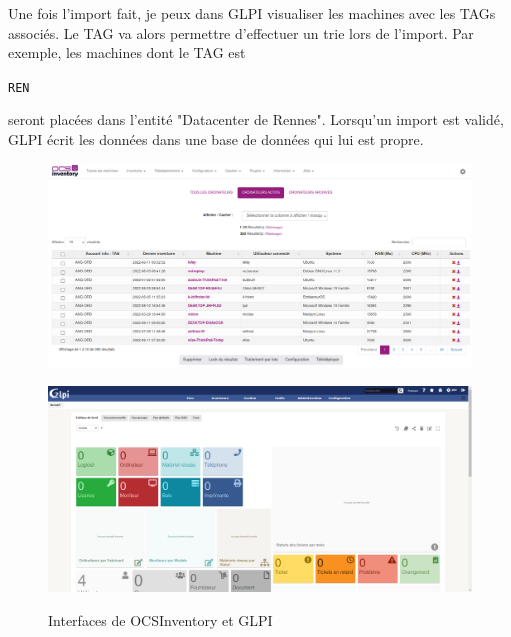 \documentclass[12pt]{article}
\begin{document}
Une fois l'import fait, je peux dans \gls{GLPI} visualiser les machines avec les TAGs associés. 
Le TAG va alors permettre d'effectuer un trie lors de l'import. 
Par exemple, les machines dont le TAG est \begin{code}\texttt{REN}\end{code} seront placées dans l'entité "Datacenter de Rennes".
Lorsqu'un import est validé, \gls{GLPI} écrit les données dans une base de données qui lui est propre. \\

\begin{figure}[ht!]
\noindent%
\begin{minipage}{.5\textwidth}%
\begin{center}
\includegraphics[width=\textwidth]{src/interface_ocsinventory.png} \\
\end{center}
\end{minipage}%
\hfill
\begin{minipage}{.5\textwidth}%
\begin{center}
\includegraphics[width=\textwidth]{src/interface_glpi.png} \\
\end{center}
\end{minipage}%
    \caption{Interfaces de \gls{OCSInventory} et \gls{GLPI}}
\end{figure}
\end{document}
